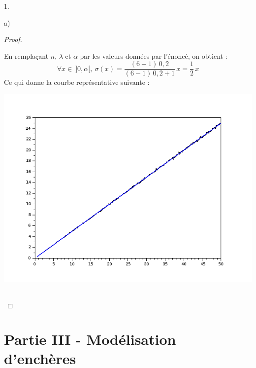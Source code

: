 \begin{noliste}{1.}
\begin{noliste}{a)}
\begin{proof}
      \begin{remark}
        En remplaçant $n$, $\lambda$ et $\alpha$ par les valeurs données
        par l'énoncé, on obtient :
        \[
          \forall x \in \ ]0,\alpha[, \ \sigma(x)  = \dfrac{(6-1) 
          \, 0,2}{(6-1) \, 0,2 +1} \, x = \dfrac{1}{2} \, x
        \]
        Ce qui donne la courbe représentative suivante :
        
        \begin{center}
	  \includegraphics[scale=.37]
	  {Figures/ESSEC-I_2018/Figure2_ESSEC-I_2018.png}
        \end{center}
      \end{remark}~\\[-1.4cm]
    \end{proof}
  \end{noliste}
\end{noliste}



\newpage



\section*{Partie III - Modélisation d'enchères}

